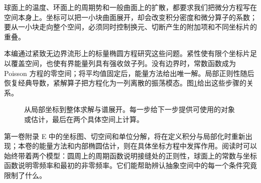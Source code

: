 \BookPartGuide
\label{b2:guide:06}

球面上的温度、环面上的周期势和一般曲面上的扩散，都要求我们把微分方程写在空间本身上。坐标可以把一小块曲面展开，却会改变积分密度和微分算子的系数；要从一小块走向整个空间，必须同时控制换元、切断产生的附加项和不同坐标片的重叠。

本编通过紧致无边界流形上的标量椭圆方程研究这些问题。紧性使有限个坐标片足以覆盖空间，也使有界能量列具有强收敛子列。没有边界时，常数函数成为 Poisson 方程的零空间；将平均值固定后，能量方法给出唯一解。局部正则性随后恢复经典导数，紧解算子把方程化为一列离散的振荡模态。图\ref{b2:fig:28-part-route}给出这些步骤的关系。

\begin{figure}[htbp]
\centering
{}
\caption{从局部坐标到整体求解与谱展开。每一步给下一步提供可使用的对象或估计，最后在两个具体空间上计算。}
\label{b2:fig:28-part-route}
\end{figure}

第一卷附录 E 中的坐标图、切空间和单位分解，将在定义积分与局部化时重新出现；本卷的能量方法和内部椭圆估计，则在具体坐标方程中发挥作用。阅读时可以始终带着两个模型：圆周上的周期函数说明接缝处的正则性，球面上的常数与坐标函数说明零频率和最初的非零频率。它们能帮助辨认抽象空间中的每一个条件究竟限制了什么。


